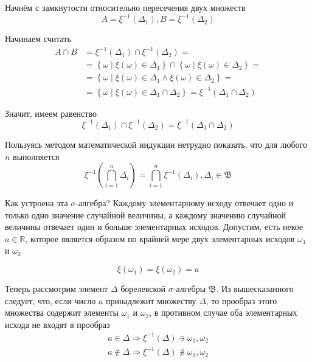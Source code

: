 \begin{enumerate}
        Начнём с замкнутости относительно пересечения двух множеств
        $$A=\xi^{-1}\left( \Delta_1 \right), B=\xi^{-1}\left( \Delta_2 \right)$$

        Начинаем считать
        \begin{align*}
            A \cap B
                &=\xi^{-1}\left( \Delta_1 \right)
                    \cap \xi^{-1}\left( \Delta_2 \right) =\\
                &=\left\{ \omega \mid \xi\left( \omega \right)
                    \in \Delta_1 \right\}
                    \cap \left\{ \omega \mid \xi\left( \omega \right)
                        \in \Delta_2 \right\} =\\
                &=\left\{ \omega \mid \xi\left( \omega \right) \in \Delta_1
                    \wedge \xi\left( \omega \right) \in \Delta_2 \right\} =\\
                &=\left\{ \omega \mid \xi\left( \omega \right)
                    \in \Delta_1 \cap \Delta_2 \right\}
                =\xi^{-1}\left( \Delta_1 \cap \Delta_2 \right)
        \end{align*}

        Значит, имеем равенство
        $$\xi^{-1}\left( \Delta_1 \right) \cap \xi^{-1}\left( \Delta_2 \right)
            =\xi^{-1}\left( \Delta_1 \cap \Delta_2 \right)$$

        Пользуясь методом математической индукции нетрудно показать,
        что для любого $n$ выполняется
        $$\xi^{-1}\left( \bigcap_{i=1}^n \Delta_i  \right)
            =\bigcap_{i=1}^n \xi^{-1}\left( \Delta_i \right),
                \Delta_i \in \mathfrak{B}$$
\end{enumerate}

Как устроена эта $\sigma$-алгебра?
Каждому элементарному исходу отвечает одно и только одно значение
случайной величины, а каждому значению случайной величины
отвечает один и больше элементарных исходов.
Допустим, есть некое $a\in\mathbb{R}$, которое является образом по крайней мере
двух элементарных исходов $\omega_1$ и $\omega_2$

$$\xi\left( \omega_1 \right) = \xi\left( \omega_2 \right) = a$$

Теперь рассмотрим элемент $\Delta$ борелевской $\sigma$-алгебры $\mathfrak{B}$.
Из вышесказанного следует, что,
если число $a$ принадлежит множеству $\Delta$, то прообраз этого множества
содержит элементы $\omega_1$ и $\omega_2$,
в противном случае оба элементарных исхода не входят в прообраз
\begin{align*}
    a \in \Delta
        \Rightarrow \xi^{-1}\left( \Delta \right) \ni \omega_1, \omega_2 \\
    a \notin \Delta
        \Rightarrow \xi^{-1}\left( \Delta \right) \not\ni \omega_1, \omega_2 \\
\end{align*}

